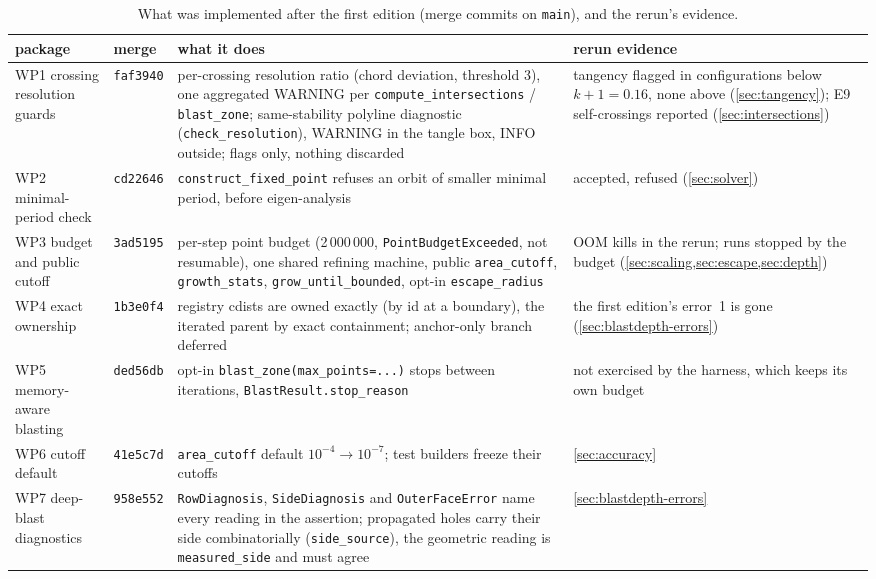 \documentclass[11pt,a4paper]{article}
\newcommand{\code}[1]{\texttt{#1}}
\begin{document}
\begin{table}[htbp]
\centering\footnotesize
\caption{What was implemented after the first edition (merge commits on
\code{main}), and the rerun's evidence.}
\label{tab:fixes}
\setlength{\tabcolsep}{3pt}
\begin{tabularx}{\textwidth}{@{}>{\raggedright\arraybackslash}p{2.7cm} >{\raggedright\arraybackslash}p{1.25cm} Y Y@{}}
\toprule
package & merge & what it does & rerun evidence \\
\midrule
WP1 crossing resolution guards & \code{faf3940} & per-crossing resolution ratio (chord deviation, threshold 3), one aggregated WARNING per \code{compute\_intersections} / \code{blast\_zone}; same-stability polyline diagnostic (\code{check\_resolution}), WARNING in the tangle box, INFO outside; flags only, nothing discarded & tangency flagged in \NumTangencyFlaggedBelow{} configurations below $k+1=0.16$, none above (\cref{sec:tangency}); E9 self-crossings reported (\cref{sec:intersections}) \\
WP2 minimal-period check & \code{cd22646} & \code{construct\_fixed\_point} refuses an orbit of smaller minimal period, before eigen-analysis & \NumSolverLowerAccepted{} accepted, \NumSolverLowerRejected{} refused (\cref{sec:solver}) \\
WP3 budget and public cutoff & \code{3ad5195} & per-step point budget (2\,000\,000, \code{PointBudgetExceeded}, not resumable), one shared refining machine, public \code{area\_cutoff}, \code{growth\_stats}, \code{grow\_until\_bounded}, opt-in \code{escape\_radius} & \NumOutcomeRerunOom{} OOM kills in the rerun; \NumOutcomeTotalBudget{} runs stopped by the budget (\cref{sec:scaling,sec:escape,sec:depth}) \\
WP4 exact ownership & \code{1b3e0f4} & registry cdists are owned exactly (by id at a boundary), the iterated parent by exact containment; anchor-only branch deferred & the first edition's error~1 is gone (\cref{sec:blastdepth-errors}) \\
WP5 memory-aware blasting & \code{ded56db} & opt-in \code{blast\_zone(max\_points=...)} stops between iterations, \code{BlastResult.stop\_reason} & not exercised by the harness, which keeps its own budget \\
WP6 cutoff default & \code{41e5c7d} & \code{area\_cutoff} default $10^{-4}\to10^{-7}$; test builders freeze their cutoffs & \cref{sec:accuracy} \\
WP7 deep-blast diagnostics & \code{958e552} & \code{RowDiagnosis}, \code{SideDiagnosis} and \code{OuterFaceError} name every reading in the assertion; propagated holes carry their side combinatorially (\code{side\_source}), the geometric reading is \code{measured\_side} and must agree & \cref{sec:blastdepth-errors} \\

\end{tabularx}
\end{table}
\end{document}
